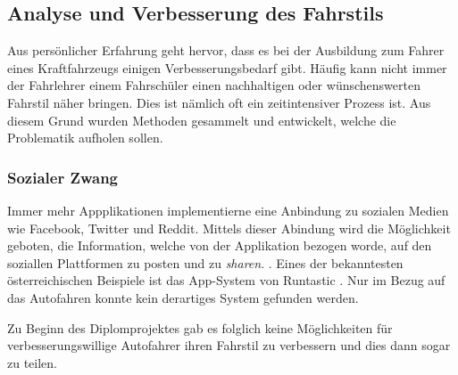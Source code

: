 \subsection{Analyse und Verbesserung des Fahrstils}

Aus persönlicher Erfahrung geht hervor, dass es bei der Ausbildung zum Fahrer eines Kraftfahrzeugs einigen Verbesserungsbedarf gibt. Häufig kann nicht immer der Fahrlehrer einem Fahrschüler einen nachhaltigen oder wünschenswerten Fahrstil näher bringen. Dies ist nämlich oft ein zeitintensiver Prozess ist. Aus diesem Grund wurden Methoden gesammelt und entwickelt, welche die Problematik aufholen sollen.

\subsubsection{Sozialer Zwang}
Immer mehr Appplikationen implementierne eine Anbindung zu sozialen Medien wie Facebook, Twitter und Reddit. Mittels dieser Abindung wird die Möglichkeit geboten, die Information, welche von der Applikation bezogen worde, auf den soziallen Plattformen zu posten und zu \textit{sharen}. \cite{SIMR.CH1-fahrstil-analyse.GewohnheitenLoslassen}. Eines der bekanntesten österreichischen Beispiele ist das App-System von Runtastic \cite{SIMR.CH1-Fahrstil-Analyse.BusinessplanRuntastic}.
Nur im Bezug auf das Autofahren konnte kein derartiges System  gefunden werden.

Zu Beginn des Diplomprojektes gab es folglich keine Möglichkeiten für verbesserungswillige Autofahrer ihren Fahrstil zu verbessern und dies dann sogar zu teilen. 

